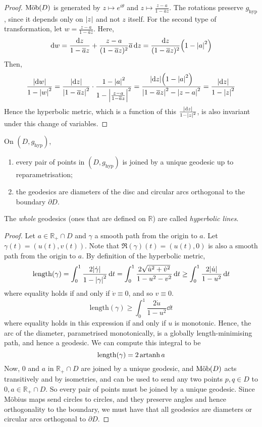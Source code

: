 \begin{proof}
	\( \text{M\"ob}(D) \) is generated by \( z \mapsto e^{i\theta} \) and \( z \mapsto \frac{z-a}{1-\overline a z} \).
	The rotations preserve \( g_{\text{hyp}} \), since it depends only on \( \abs{z} \) and not \( z \) itself.
	For the second type of transformation, let \( w = \frac{z-a}{1-\overline a z} \).
	Here,
	\[
		\dd{w} = \frac{\dd{z}}{1-\overline a z} + \frac{z-a}{(1-\overline a z)^2} \overline a \dd{z} = \frac{\dd{z}}{(1-\overline a z)^2} \qty(1 - \abs{a}^2)
	\]
	Then,
	\[
		\frac{\abs{\dd{w}}}{1-\abs{w}^2} = \frac{\abs{\dd{z}}}{\abs{1-\overline a z}^2} \cdot \frac{1 - \abs{a}^2}{1-\abs{\frac{z-a}{1-\overline a z}}^2} = \frac{\abs{\dd{z}} \qty(1-\abs{a}^2)}{\abs{1-\overline a z}^2 - \abs{z-a}^2} = \frac{\abs{\dd{z}}}{1-\abs{z}^2}
	\]
	Hence the hyperbolic metric, which is a function of this \( \frac{\abs{\dd{z}}}{1-\abs{z}^2} \), is also invariant under this change of variables.
\end{proof}
\begin{lemma}
	On \( (D, g_{\text{hyp}}) \),
	\begin{enumerate}
		\item every pair of points in \( (D, g_{\text{hyp}}) \) is joined by a unique geodesic up to reparametrisation;
		\item the geodesics are diameters of the disc and circular arcs orthogonal to the boundary \( \partial D \).
	\end{enumerate}
	The \textit{whole} geodesics (ones that are defined on \( \mathbb R \)) are called \textit{hyperbolic lines}.
\end{lemma}
\begin{proof}
	Let \( a \in \mathbb R_+ \cap D \) and \( \gamma \) a smooth path from the origin to \( a \).
	Let \( \gamma(t) = (u(t),v(t)) \).
	Note that \( \Re(\gamma)(t) = (u(t),0) \) is also a smooth path from the origin to \( a \).
	By definition of the hyperbolic metric,
	\[
		\mathrm{length}(\gamma) = \int_0^1 \frac{2\abs{\dot \gamma}}{1 - \abs{\gamma}^2} \dd{t} = \int_0^1 \frac{2\sqrt{\dot u^2 + \dot v^2}}{1-u^2 - v^2} \dd{t} \geq \int_0^1 \frac{2 \abs{\dot u}}{1-u^2} \dd{t}
	\]
	where equality holds if and only if \( \dot v \equiv 0 \), and so \( v \equiv 0 \).
	\[
		\mathrm{length}(\gamma) \geq \int_0^1 \frac{2 \dot u}{1-u^2} \dd{t}
	\]
	where equality holds in this expression if and only if \( u \) is monotonic.
	Hence, the arc of the diameter, parametrised monotonically, is a globally length-minimising path, and hence a geodesic.
	We can compute this integral to be
	\[
		\mathrm{length}(\gamma) = 2\operatorname{artanh} a
	\]
	Now, \( 0 \) and \( a \) in \( \mathbb R_+ \cap D \) are joined by a unique geodesic, and \( \text{M\"ob}(D) \) acts transitively and by isometries, and can be used to send any two points \( p,q \in D \) to \( 0,a \in \mathbb R_+ \cap D \).
	So every pair of points must be joined by a unique geodesic.
	Since M\"obius maps send circles to circles, and they preserve angles and hence orthogonality to the boundary, we must have that all geodesics are diameters or circular arcs orthogonal to \( \partial D \).
\end{proof}
